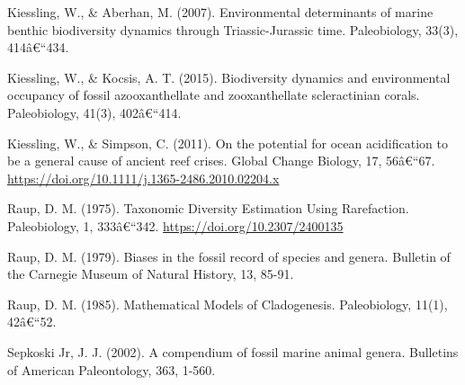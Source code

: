 \documentclass[]{article}
\begin{document}
Kiessling, W., \& Aberhan, M. (2007). Environmental determinants of
marine benthic biodiversity dynamics through Triassic-Jurassic time.
Paleobiology, 33(3), 414â€``434.

Kiessling, W., \& Kocsis, A. T. (2015). Biodiversity dynamics and
environmental occupancy of fossil azooxanthellate and zooxanthellate
scleractinian corals. Paleobiology, 41(3), 402â€``414.

Kiessling, W., \& Simpson, C. (2011). On the potential for ocean
acidification to be a general cause of ancient reef crises. Global
Change Biology, 17, 56â€``67.
\url{https://doi.org/10.1111/j.1365-2486.2010.02204.x}

Raup, D. M. (1975). Taxonomic Diversity Estimation Using Rarefaction.
Paleobiology, 1, 333â€``342. \url{https://doi.org/10.2307/2400135}

Raup, D. M. (1979). Biases in the fossil record of species and genera.
Bulletin of the Carnegie Museum of Natural History, 13, 85-91.

Raup, D. M. (1985). Mathematical Models of Cladogenesis. Paleobiology,
11(1), 42â€``52.

Sepkoski Jr, J. J. (2002). A compendium of fossil marine animal genera.
Bulletins of American Paleontology, 363, 1-560.
\end{document}
